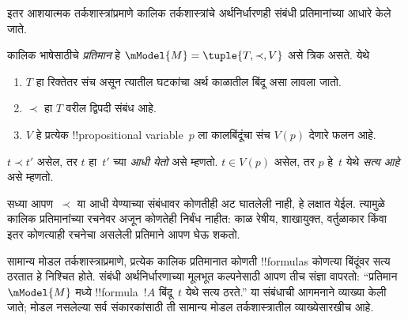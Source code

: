 \documentclass[../../../include/open-logic-section]{subfiles}
\begin{document}
इतर आशयात्मक तर्कशास्त्रांप्रमाणे कालिक तर्कशास्त्रांचे
अर्थनिर्धारणही संबंधी प्रतिमानांच्या आधारे केले जाते.

\begin{defn}
  कालिक भाषेसाठीचे \emph{प्रतिमान} हे
  $\mModel{M} = \tuple{T, \prec, V}$ असे त्रिक असते. येथे
  \begin{enumerate}
  \item $T$ हा रिक्तेतर संच असून त्यातील घटकांचा अर्थ
    काळातील बिंदू असा लावला जातो.
  \item $\prec$ हा $T$ वरील द्विपदी संबंध आहे.
  \item $V$ हे प्रत्येक !!{propositional
    variable}~$p$ ला कालबिंदूंचा संच $V(p)$ देणारे फलन आहे.
  \end{enumerate}
  $t \prec t'$ असेल, तर $t$ हा~$t'$ च्या \emph{आधी येतो}
  असे म्हणतो. $t \in V(p)$ असेल, तर $p$ हे~$t$ येथे
  \emph{सत्य आहे} असे म्हणतो.
\end{defn}

सध्या आपण~$\prec$ या आधी येण्याच्या संबंधावर कोणतीही अट
घातलेली नाही, हे लक्षात येईल. त्यामुळे कालिक
प्रतिमानांच्या रचनेवर अजून कोणतेही निर्बंध नाहीत:
काळ रेषीय, शाखायुक्त, वर्तुळाकार किंवा इतर
कोणत्याही रचनेचा असलेली प्रतिमाने आपण घेऊ शकतो.

सामान्य मोडल तर्कशास्त्राप्रमाणे, प्रत्येक कालिक
प्रतिमानात कोणती !!{formula}s कोणत्या बिंदूंवर
सत्य ठरतात हे निश्चित होते. संबंधी अर्थनिर्धारणाच्या
मूलभूत कल्पनेसाठी आपण तीच संज्ञा वापरतो:
``प्रतिमान~$\mModel{M}$ मध्ये !!{formula}~$!A$
बिंदू~$t$ येथे सत्य ठरते.'' या संबंधाची आगमनाने
व्याख्या केली जाते; मोडल नसलेल्या सर्व संकारकांसाठी
ती सामान्य मोडल तर्कशास्त्रातील व्याख्येसारखीच आहे.
\end{document}
